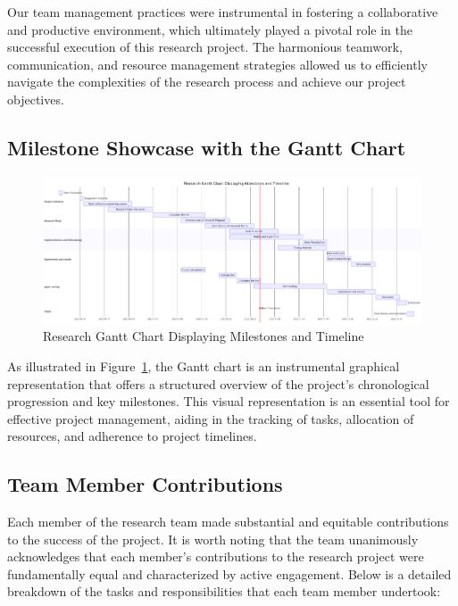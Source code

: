 \documentclass[conference]{IEEEtran}
\begin{document}
Our team management practices were instrumental in fostering a collaborative and productive environment, which ultimately played a pivotal role in the successful execution of this research project.  The harmonious teamwork, communication, and resource management strategies allowed us to efficiently navigate the complexities of the research process and achieve our project objectives.

\subsection{Milestone Showcase with the Gantt Chart}

\begin{figure}[htbp]
\centerline{\includegraphics[scale=0.26]{figures/Gantt.png}}
\caption{Research Gantt Chart Displaying Milestones and Timeline}
\label{fig: Gantt}
\end{figure}

As illustrated in Figure~\ref{fig: Gantt}, the Gantt chart is an instrumental graphical representation that offers a structured overview of the project's chronological progression and key milestones.  This visual representation is an essential tool for effective project management, aiding in the tracking of tasks, allocation of resources, and adherence to project timelines.

\subsection{Team Member Contributions}
Each member of the research team made substantial and equitable contributions to the success of the project. It is worth noting that the team unanimously acknowledges that each member's contributions to the research project were fundamentally equal and characterized by active engagement. Below is a detailed breakdown of the tasks and responsibilities that each team member undertook:
\end{document}
